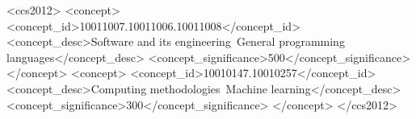 \documentclass[acmsmall,review]{acmart}
\begin{document}
\begin{CCSXML}
<ccs2012>
  <concept>
    <concept_id>10011007.10011006.10011008</concept_id>
    <concept_desc>Software and its engineering~General programming languages</concept_desc>
    <concept_significance>500</concept_significance>
  </concept>
  <concept>
    <concept_id>10010147.10010257</concept_id>
    <concept_desc>Computing methodologies~Machine learning</concept_desc>
    <concept_significance>300</concept_significance>
  </concept>
</ccs2012>
\end{CCSXML}



\maketitle





\appendix
\end{document}
